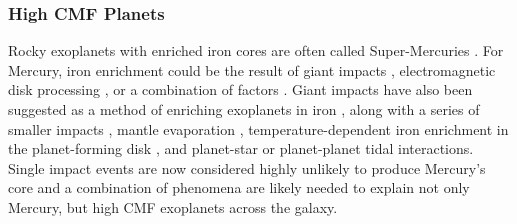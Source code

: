 \documentclass[twocolumn]{aastex631}
\begin{document}
\subsubsection{High CMF Planets}
Rocky exoplanets with enriched iron cores are often called Super-Mercuries \citep{2010ApJ...712L..73M}. For Mercury, iron enrichment could be the result of giant impacts \citep{2004ApJ...613L.157A}, electromagnetic disk processing \citep{2021PEPS....8...39M}, or a combination of factors \citep{Ebel2018}. Giant impacts have also been suggested as a method of enriching exoplanets in iron \citep{2010ApJ...712L..73M, 2012ApJ...745...79L}, along with a series of smaller impacts \citep{2018ApJ...865...35C, 2019ApJ...881..117S}, mantle evaporation \citep{2018NatAs...2..393S}, temperature-dependent iron enrichment in the planet-forming disk \citep{1972E&PSL..15..286L}, and planet-star \citep{2017MNRAS.465..149J} or planet-planet \citep{2020ApJ...888L...1D} tidal interactions. Single impact events are now considered highly unlikely to produce Mercury's core \citep{2019AJ....157..208C, 2022MNRAS.515.5576F} and a combination of phenomena are likely needed to explain not only Mercury, but high CMF exoplanets across the galaxy.
\end{document}
